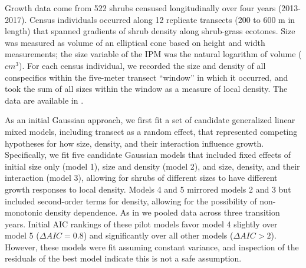 \documentclass[12pt]{article}
\begin{document}
Growth data come from 522 shrubs censused longitudinally over four years (2013-2017). 
Census individuals occurred along 12 replicate transects (200 to 600 m in length) that spanned gradients of shrub density along shrub-grass ecotones. 
Size was measured as volume of an elliptical cone based on height and width measurements; the size variable of the IPM was the natural logarithm of volume ($cm^3$). 
For each census individual, we recorded the size and density of all conspecifics within the five-meter transect ``window'' in which it occurred, and took the sum of all sizes within the window as a measure of local density. 
The data are available in \cite{shrubdata}. 

As an initial Gaussian approach, we first fit a set of candidate generalized linear mixed models, including transect as a random effect, that represented competing hypotheses for how size, density, and their interaction influence growth. 
Specifically, we fit five candidate Gaussian models that included fixed effects of initial size only (model 1), size and density (model 2), and size, density, and their interaction (model 3), allowing for shrubs of different sizes to have different growth responses to local density. 
Models 4 and 5 mirrored models 2 and 3 but included second-order terms for density, allowing for the possibility of non-monotonic density dependence. 
As in \citep{drees2023demography} we pooled data across three transition years. 
Initial AIC rankings of these pilot models favor model 4 slightly over model 5 ($\Delta AIC = 0.8$) and significantly over all other models ($\Delta AIC > 2$). 
However, these models were fit assuming constant variance, and inspection of the residuals of the best model indicate this is not a safe assumption. 
\end{document}
